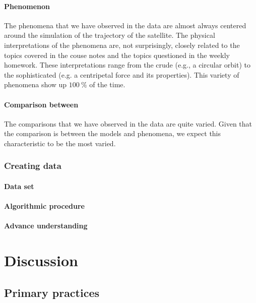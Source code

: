 \documentclass{msuphddissertation}
\begin{document}
\begin{doublespace}
\subsubsection{Phenomenon}

The phenomena that we have observed in the data are almost always centered around the simulation of the trajectory of the satellite.  The physical interpretations of the phenomena are, not surprisingly, closely related to the topics covered in the couse notes and the topics questioned in the weekly homework.  These interpretations range from the crude (e.g., a circular orbit) to the sophisticated (e.g. a centripetal force and its properties).  This variety of phenomena show up $\SI{100}{\percent}$ of the time.

\subsubsection{Comparison between}

The comparisons that we have observed in the data are quite varied.  Given that the comparison is between the models and phenomena, we expect this characteristic to be the most varied.

\subsection{Creating data}

\subsubsection{Data set}

\subsubsection{Algorithmic procedure}

\subsubsection{Advance understanding}

%
%

\chapter{Discussion}\label{CH6:Discussion}


\section{Primary practices}


\end{doublespace}
\end{document}
